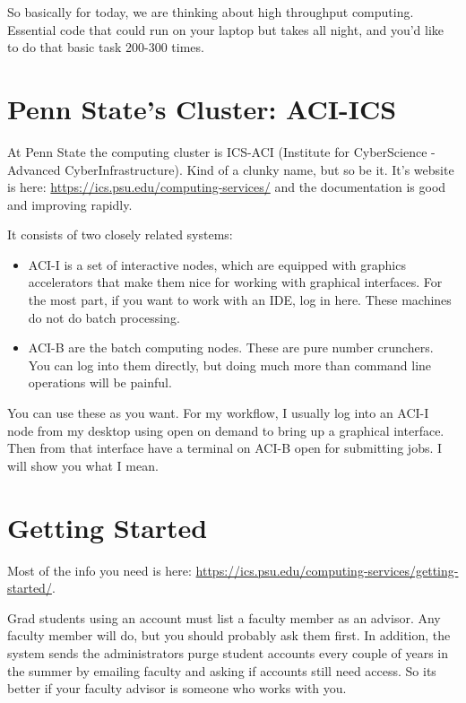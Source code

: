 \documentclass[twoside]{article}
\begin{document}
So basically for today, we are thinking about high throughput computing. Essential code that could run on your laptop but takes all night, and you'd like to do that basic task 200-300 times. 

\section{Penn State's Cluster: ACI-ICS}
 
 At Penn State the computing cluster is ICS-ACI (Institute for CyberScience - Advanced CyberInfrastructure). Kind of a clunky name, but so be it.  It's website is here: \url{https://ics.psu.edu/computing-services/} and the documentation is good and improving rapidly.
 
 It consists of two closely related systems: 
 
\begin{itemize}

\item ACI-I is a set of interactive nodes, which are equipped with graphics accelerators that make them nice for working with graphical interfaces. For the most part, if you want to work with an IDE, log in here. These machines do not do batch processing. 

\item ACI-B are the batch computing nodes. These are pure number crunchers. You can log into them directly, but doing much more than command line operations will be painful. 
 
 \end{itemize}
 
 You can use these as you want. For my workflow, I usually log into an ACI-I node from my desktop using open on demand to bring up a graphical interface. Then from that interface have a terminal on ACI-B open for submitting jobs. I will show you what I mean. 

\section{Getting Started}

Most of the info you need is here: \url{https://ics.psu.edu/computing-services/getting-started/}.
 
Grad students using an account must list a faculty member as an advisor. Any faculty member will do, but you should probably ask them first. In addition, the system sends the administrators purge student accounts every couple of years in the summer by emailing faculty and asking if accounts still need access.  So its better if your faculty advisor is someone who works with you. 
\end{document}
